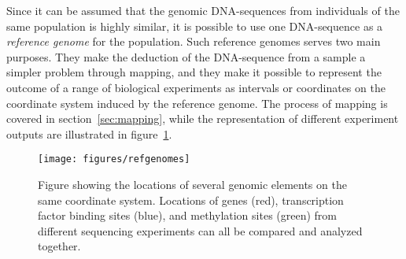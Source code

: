 Since it can be assumed that the genomic DNA-sequences from individuals of the same population is highly similar, it is possible to use one DNA-sequence as a \emph{reference genome} for the population.
Such reference genomes serves two main purposes.
They make the deduction of the DNA-sequence from a sample a simpler problem through mapping, and they make it possible to represent the outcome of a range of biological experiments as intervals or coordinates on the coordinate system induced by the reference genome. The process of mapping is covered in section~\ref{sec:mapping}, while the representation of different experiment outputs are illustrated in figure~\ref{fig:refpos}.

\begin{figure}
  \texttt{[image: figures/refgenomes]}
  \label{fig:refpos}
  \caption{Figure showing the locations of several genomic elements on the same coordinate system.
    Locations of genes (red), transcription factor binding sites (blue), and methylation sites (green) from different sequencing experiments can all be compared and analyzed together.}
\end{figure}


